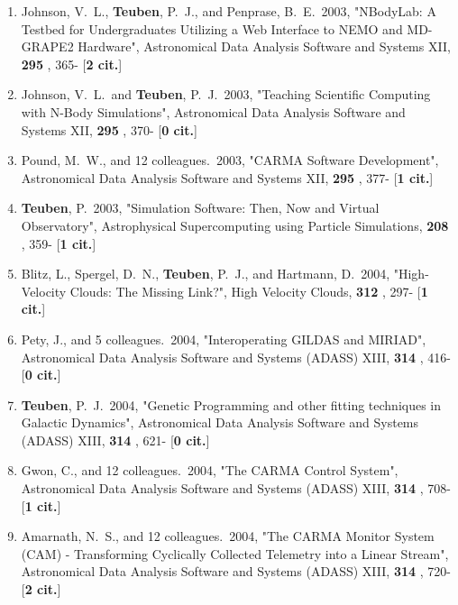 \documentclass[11pt,letterpaper]{article}
\begin{document}
\begin{enumerate}[resume,label=\textbf{\arabic*}.]
\item  
Johnson, V.~L., {\bf Teuben}, P.~J., and Penprase, B.~E.\  2003,  "NBodyLab: A 
Testbed for Undergraduates Utilizing a Web Interface to NEMO and MD-GRAPE2 
Hardware", Astronomical Data Analysis Software and Systems XII,  {\bf 295} 
, 365- [{\bf 2 cit.}] 

\item  
Johnson, V.~L.~and {\bf Teuben}, P.~J.\  2003,  "Teaching Scientific Computing 
with N-Body Simulations", Astronomical Data Analysis Software and Systems 
XII,  {\bf 295} , 370- [{\bf 0 cit.}] 

\item  
Pound, M.~W., and 12 colleagues.\  2003,  "CARMA Software Development", 
Astronomical Data Analysis Software and Systems XII,  {\bf 295} , 377- 
[{\bf 1 cit.}] 

\item  
{\bf Teuben}, P.\  2003,  "Simulation Software: Then, Now and Virtual 
Observatory", Astrophysical Supercomputing using Particle Simulations,  
{\bf 208} , 359- [{\bf 1 cit.}] 


\item  
Blitz, L., Spergel, D.~N., {\bf Teuben}, P.~J., and Hartmann, D.\  2004,  
"High-Velocity Clouds: The Missing Link?", High Velocity Clouds,  {\bf 312} 
, 297- [{\bf 1 cit.}] 

\item  
Pety, J., and 5 colleagues.\  2004,  "Interoperating GILDAS and MIRIAD", 
Astronomical Data Analysis Software and Systems (ADASS) XIII,  {\bf 314} , 
416- [{\bf 0 cit.}] 

\item  
{\bf Teuben}, P.~J.\  2004,  "Genetic Programming and other fitting techniques 
in Galactic Dynamics", Astronomical Data Analysis Software and Systems 
(ADASS) XIII,  {\bf 314} , 621- [{\bf 0 cit.}] 

\item  
Gwon, C., and 12 colleagues.\  2004,  "The CARMA Control System", 
Astronomical Data Analysis Software and Systems (ADASS) XIII,  {\bf 314} , 
708- [{\bf 1 cit.}] 

\item  
Amarnath, N.~S., and 12 colleagues.\  2004,  "The CARMA Monitor System 
(CAM) - Transforming Cyclically Collected Telemetry into a Linear Stream", 
Astronomical Data Analysis Software and Systems (ADASS) XIII,  {\bf 314} , 
720- [{\bf 2 cit.}] 


\end{enumerate}
\end{document}
